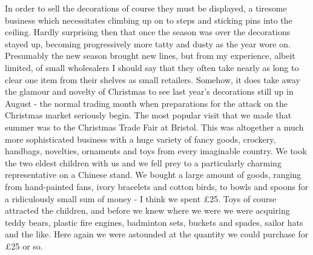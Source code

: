 In order to sell the decorations of course they must be displayed, a tiresome business which necessitates climbing up on to steps and sticking pins into the ceiling. Hardly surprising then that once the season was over the decorations stayed up, becoming progressively more tatty and dusty as the year wore on. Presumably the new season brought new lines, but from my experience, albeit limited, of small wholesalers I should say that they often take nearly as long to clear one item from their shelves as small retailers. Somehow, it does take away the glamour and novelty of Christmas to see last year's decorations still up in August - the normal trading month when preparations for the attack on the Christmas market seriously begin. The most popular visit that we made that summer was to the Christmas Trade Fair at Bristol. This was altogether a much more sophisticated business with a huge variety of fancy goods, crockery, handbags, novelties, ornaments and toys from every imaginable country. We took the two eldest children with us and we fell prey to a particularly charming representative on a Chinese stand. We bought a large amount of goods, ranging from hand-painted fans, ivory bracelets and cotton birds, to bowls and spoons for a ridiculously small sum of money - I think we spent £25. Toys of course attracted the children, and before we knew where we were we were acquiring teddy bears, plastic fire engines, badminton sets, buckets and spades, sailor hats and the like. Here again we were astounded at the quantity we could purchase for £25 or so.

